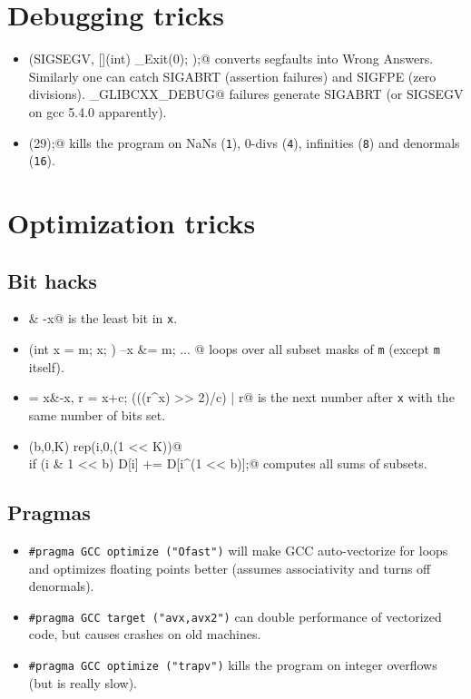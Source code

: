 \section{Debugging tricks}
	\begin{itemize}
		\item \verb@signal(SIGSEGV, [](int) { _Exit(0); });@ converts segfaults into Wrong Answers.
			Similarly one can catch SIGABRT (assertion failures) and SIGFPE (zero divisions).
			\verb@_GLIBCXX_DEBUG@ failures generate SIGABRT (or SIGSEGV on gcc 5.4.0 apparently).
		\item \verb@feenableexcept(29);@ kills the program on NaNs (\texttt 1), 0-divs (\texttt 4), infinities (\texttt 8) and denormals (\texttt{16}).
	\end{itemize}

\section{Optimization tricks}
	\subsection{Bit hacks}
		\begin{itemize}
			\item \verb@x & -x@ is the least bit in \texttt{x}.
			\item \verb@for (int x = m; x; ) { --x &= m; ... }@ loops over all subset masks of \texttt{m} (except \texttt{m} itself).
			\item \verb@c = x&-x, r = x+c; (((r^x) >> 2)/c) | r@ is the next number after \texttt{x} with the same number of bits set.
			\item \verb@rep(b,0,K) rep(i,0,(1 << K))@ \\ \verb@  if (i & 1 << b) D[i] += D[i^(1 << b)];@ computes all sums of subsets.
		\end{itemize}
	\subsection{Pragmas}
		\begin{itemize}
			\item \lstinline{#pragma GCC optimize ("Ofast")} will make GCC auto-vectorize for loops and optimizes floating points better (assumes associativity and turns off denormals).
			\item \lstinline{#pragma GCC target ("avx,avx2")} can double performance of vectorized code, but causes crashes on old machines.
			\item \lstinline{#pragma GCC optimize ("trapv")} kills the program on integer overflows (but is really slow).
		\end{itemize}
